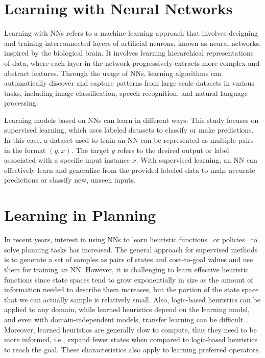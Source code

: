 \documentclass[ppgc,diss,english]{iiufrgs}
\begin{document}
\section{Learning with Neural Networks}
\label{sec:intro-deep-learning}
Learning with NNs refers to a machine learning approach that involves designing and training interconnected layers of artificial neurons, known as neural networks, inspired by the biological brain.
It involves learning hierarchical representations of data, where each layer in the network progressively extracts more complex and abstract features. Through the usage of NNs, learning algorithms can automatically discover and capture patterns from large-scale datasets in various tasks, including image classification, speech recognition, and natural language processing.

Learning models based on NNs can learn in different ways. This study focuses on supervised learning, which uses labeled datasets to classify or make predictions. In this case, a dataset used to train an NN can be represented as multiple pairs in the format $(y, x)$. The target $y$ refers to the desired output or label associated with a specific input instance $x$. With supervised learning, an NN can effectively learn and generalize from the provided labeled data to make accurate predictions or classify new, unseen inputs.


\section{Learning in Planning}
\label{sec:intro-learning-planning}
In recent years, interest in using NNs to learn heuristic functions~\cite{Ferber.etal/2020a,Yu.etal/2020,Shen.etal/2020,Ferber.etal/2022,OToole/2022,Bettker.etal/2022} or policies~\cite{Toyer.etal/2018,Toyer.etal/2020,Stahlberg.etal/2022} to solve planning tasks has increased. The general approach for supervised methods is to generate a set of samples as pairs of states and cost-to-goal values and use them for training an NN. However, it is challenging to learn effective heuristic functions since state spaces tend to grow exponentially in size as the amount of information needed to describe them increases, but the portion of the state space that we can actually sample is relatively small. Also, logic-based heuristics can be applied to any domain, while learned heuristics depend on the learning model, and even with domain-independent models, transfer learning can be difficult~\cite{Shen.etal/2020}. Moreover, learned heuristics are generally slow to compute, thus they need to be more informed, i.e., expand fewer states when compared to logic-based heuristics to reach the goal. These characteristics also apply to learning preferred operators.
\end{document}

